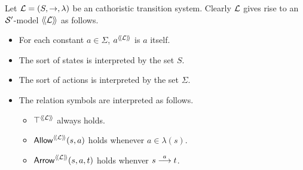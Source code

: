 \begin{definition}
Let $\mathcal{L} = (S, \rightarrow, \lambda)$ be an cathoristic transition
system. Clearly $\mathcal{L}$ gives rise to an $\mathcal{S}'$-model $\langle\!\langle \mathcal{L} \rangle\!\rangle$
as follows.
\begin{itemize}

\item For each constant $a \in \Sigma$, $a^{\langle\!\langle \mathcal{L} \rangle\!\rangle}$ is $a$ itself.

\item The sort of states is interpreted by the set $S$.

\item The sort of actions is interpreted by the set $\Sigma$.

\item The relation symbols are interpreted as follows.

  \begin{itemize}

    \item $\top^{\langle\!\langle \mathcal{L} \rangle\!\rangle}$ always holds.

    \item $\mathsf{Allow}^{\langle\!\langle \mathcal{L} \rangle\!\rangle}(s, a)$ holds whenever $a \in \lambda(s)$.

    \item $\mathsf{Arrow}^{\langle\!\langle \mathcal{L} \rangle\!\rangle}(s, a, t)$ holds whenver $s \stackrel{a}{\longrightarrow} t$.

  \end{itemize}
\end{itemize}
\end{definition}


